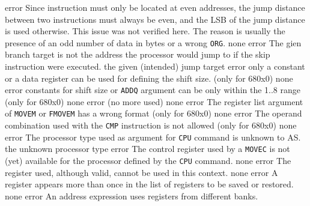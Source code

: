 \documentclass[12pt,twoside]{report}
\newcommand{\tty}[1]{{\tt #1}}
\begin{document}
\begin{description}
               {error}
               {Since instruction must only be located at even addresses,
                the jump distance between two instructions must always be
                even, and the LSB of the jump distance is used otherwise.
                This issue was not verified here. The reason is usually the
                presence of an odd number of data in bytes or a wrong
                \tty{ORG}.}
               {none}
               {error}
               {The gien branch target is not the address the processor would
                jump to if the skip instruction were executed.}
               {the given (intended) jump target}
               {error}
               {only a constant or a data register can be used for defining
                the shift size. (only for 680x0)}
               {none}
               {error}
               {constants for shift size or \tty{ADDQ} argument can be only
                within the 1..8 range (only for 680x0)}
               {none}
               {error}
               {(no more used)}
               {none}
               {error}
               {The register list argument of \tty{MOVEM} or \tty{FMOVEM} has a
                wrong format (only for 680x0)}
               {none}
               {error}
               {The operand combination used with the \tty{CMP} instruction is
                not allowed (only for 680x0)}
               {none}
               {error}
               {The processor type used as argument for \tty{CPU} command is
                unknown to AS.}
               {the unknown processor type}
               {error}
               {The control register used by a \tty{MOVEC} is not (yet) available
                for the processor defined by the \tty{CPU} command.}
               {none}
               {error}
               {The register used, although valid, cannot be used in this
                context.}
               {none}
               {error}
               {A register appears more than once in the list of registers
                to be saved or restored.}
               {none}
               {error}
               {An address expression uses registers from different banks.}

\end{description}
\end{document}
